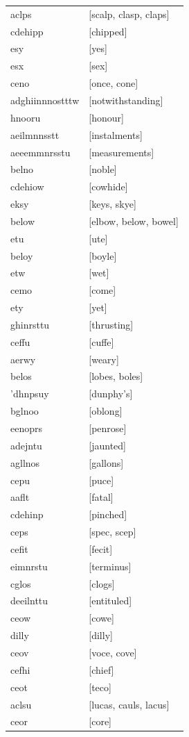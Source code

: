 \documentclass{article}
\begin{document}
\begin{tabular}{ll}
aclps & [scalp, clasp, claps] \\
cdehipp & [chipped] \\
esy & [yes] \\
esx & [sex] \\
ceno & [once, cone] \\
adghiinnnostttw & [notwithstanding] \\
hnooru & [honour] \\
aeilmnnsstt & [instalments] \\
aeeemmnrsstu & [measurements] \\
belno & [noble] \\
cdehiow & [cowhide] \\
eksy & [keys, skye] \\
below & [elbow, below, bowel] \\
etu & [ute] \\
beloy & [boyle] \\
etw & [wet] \\
cemo & [come] \\
ety & [yet] \\
ghinrsttu & [thrusting] \\
ceffu & [cuffe] \\
aerwy & [weary] \\
belos & [lobes, boles] \\
'dhnpsuy & [dunphy's] \\
bglnoo & [oblong] \\
eenoprs & [penrose] \\
adejntu & [jaunted] \\
agllnos & [gallons] \\
cepu & [puce] \\
aaflt & [fatal] \\
cdehinp & [pinched] \\
ceps & [spec, scep] \\
cefit & [fecit] \\
eimnrstu & [terminus] \\
cglos & [clogs] \\
deeilnttu & [entituled] \\
ceow & [cowe] \\
dilly & [dilly] \\
ceov & [voce, cove] \\
cefhi & [chief] \\
ceot & [teco] \\
aclsu & [lucas, cauls, lacus] \\
ceor & [core] \\

\end{tabular}
\end{document}
